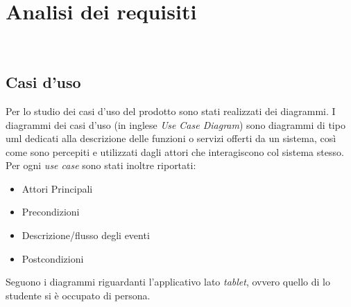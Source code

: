 \chapter{Analisi dei requisiti}
\label{cap:analisi-requisiti}

\\

\section{Casi d'uso}

Per lo studio dei casi d'uso del prodotto sono stati realizzati dei diagrammi.
I diagrammi dei casi d'uso (in inglese \emph{Use Case Diagram}) sono diagrammi di tipo \gls{uml} dedicati alla descrizione delle funzioni o servizi offerti da un sistema, così come sono percepiti e utilizzati dagli attori che interagiscono col sistema stesso.
Per ogni \emph{use case} sono stati inoltre riportati:
\begin{itemize}
	\item Attori Principali
	\item Precondizioni
	\item Descrizione/flusso degli eventi
	\item Postcondizioni
\end{itemize}
Seguono i diagrammi riguardanti l'applicativo lato \emph{tablet}, ovvero quello di lo studente si è occupato di persona.


